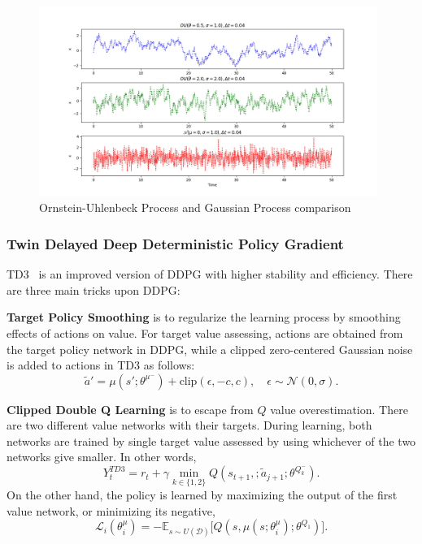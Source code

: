 \begin{figure}
	\centering
	\includegraphics[width=0.98\textwidth]{figures/others/random_processes.png}
	\caption{Ornstein-Uhlenbeck Process and Gaussian Process comparison}
	\label{fig:ou_vs_gaussian}
\end{figure}

\subsubsection{Twin Delayed Deep Deterministic Policy Gradient}
TD3~\cite{fujimoto_addressing_2018} is an improved version of DDPG with higher stability and efficiency. 
There are three main tricks upon DDPG: 

\textbf{Target Policy Smoothing} is to regularize the learning process by smoothing effects of actions on value. For target value assessing, actions are obtained from the target policy network in DDPG, while a clipped zero-centered Gaussian noise is added to actions in TD3 as follows: 
\begin{equation}
\label{eqn:td3_target_action}
\widetilde{a}' = \mu(s';\theta^{\mu^-}) + \text{clip}(\epsilon, -c, c), \quad \epsilon \sim \mathcal{N}(0, \sigma).
\end{equation}

\textbf{Clipped Double Q Learning} is to escape from $Q$ value overestimation. 
There are two different value networks with their targets. 
During learning, both networks are trained by single target value assessed by using whichever of the two networks give smaller. 
In other words, 
\begin{equation}
\label{eqn:td3_target}
Y_t^{TD3} = r_t + \gamma \min_{k\in\{1,2\}} Q(s_{t+1}, ;\widetilde{a}_{j+1};\theta^{Q_k^-}).
\end{equation}
On the other hand, the policy is learned by maximizing the output of the first value network, or minimizing its negative,
\begin{equation}
\label{eqn:td3_policy_loss}
\mathcal{L}_i(\theta^\mu_i) = -\mathbb{E}_{s \sim U(\mathcal{D})} \Big[ Q(s, \mu(s;\theta^\mu_i);\theta^{Q_1}) \Big].
\end{equation} 

